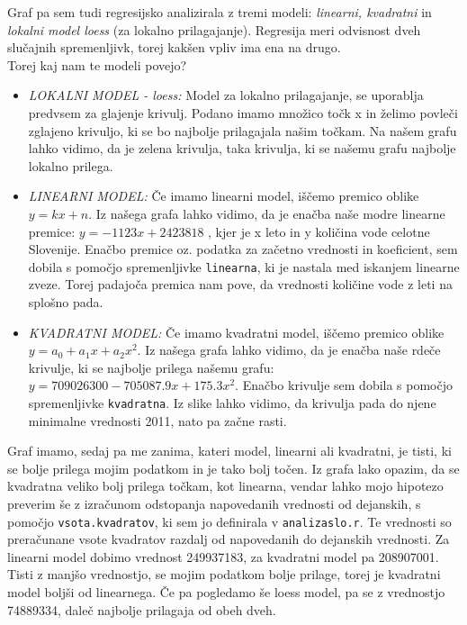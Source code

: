 \documentclass[11pt,a4paper]{article}
\begin{document}

Graf pa sem tudi regresijsko analizirala z tremi modeli: \emph{linearni, kvadratni} in \emph{lokalni model loess} (za lokalno prilagajanje). Regresija meri odvisnost dveh slučajnih spremenljivk, torej kakšen vpliv ima ena na drugo.\\
Torej kaj nam te modeli povejo?
\begin{itemize}
\item{\emph{LOKALNI MODEL - loess:} Model za lokalno prilagajanje, se uporablja predvsem za glajenje krivulj. Podano imamo množico točk x in želimo povleči zglajeno krivuljo, ki se bo najbolje prilagajala našim točkam. Na našem grafu lahko vidimo, da je zelena krivulja, taka krivulja, ki se našemu grafu najbolje lokalno prilega.}
\newpage
\item{\emph{LINEARNI MODEL:} Če imamo linearni model, iščemo premico oblike $y = kx + n$. Iz našega grafa lahko vidimo, da je enačba naše modre linearne premice: $y = -1123x + 2423818$ , kjer je x leto in y količina vode celotne Slovenije. Enačbo premice oz. podatka za začetno vrednosti in koeficient, sem dobila s pomočjo spremenljivke \verb|linearna|, ki je nastala med iskanjem linearne zveze. Torej padajoča premica nam pove, da vrednosti količine vode z leti na splošno pada.}

\item{\emph{KVADRATNI MODEL:} Če imamo kvadratni model, iščemo premico oblike $y = a_0 + a_1x +a_2x^2$. Iz našega grafa lahko vidimo, da je enačba naše rdeče krivulje, ki se najbolje prilega našemu grafu: $y = 709026300 - 705087.9x + 175.3x^2$. Enačbo krivulje sem dobila s pomočjo spremenljivke \verb|kvadratna|. Iz slike lahko vidimo, da krivulja pada do njene minimalne vrednosti 2011, nato pa začne rasti.}
\end{itemize}

Graf imamo, sedaj pa me zanima, kateri model, linearni ali kvadratni, je tisti, ki se bolje prilega mojim podatkom in je tako bolj točen. Iz grafa lako opazim, da se kvadratna veliko bolj prilega točkam, kot linearna, vendar lahko mojo hipotezo preverim še z izračunom odstopanja napovedanih vrednosti od dejanskih, s pomočjo \verb|vsota.kvadratov|, ki sem jo definirala v \verb|analizaslo.r|. Te vrednosti so preračunane vsote kvadratov razdalj od napovedanih do dejanskih vrednosti. Za linearni model dobimo vrednost 249937183, za kvadratni model pa 208907001. Tisti z manjšo vrednostjo, se mojim podatkom bolje prilage, torej je kvadratni model boljši od linearnega. Če pa pogledamo še loess model, pa se z vrednostjo 74889334, daleč najbolje prilagaja od obeh dveh.
\end{document}
